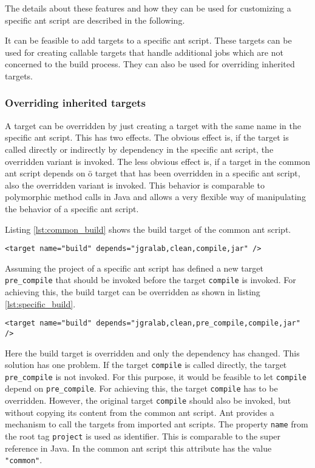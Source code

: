 \documentclass[a4paper,twoside,11pt,bibtotoc]{article}
\begin{document}
The details about these features and how they can be used for customizing a specific ant script are described in the following.

It can be feasible to add targets to a specific ant script.
These targets can be used for creating callable targets that handle additional jobs which are not concerned to the build process.%
They can also be used for overriding inherited targets.

\subsubsection{Overriding inherited targets}
\label{sec:override}
A target can be overridden by just creating a target with the same name in the specific ant script.
This has two effects.
The obvious effect is, if the target is called directly or indirectly by dependency in the specific ant script, the overridden variant is invoked.
The less obvious effect is, if a target in the common ant script depends on ö target that has been overridden in a specific ant script, also the overridden variant is invoked.
This behavior is comparable to polymorphic method calls in Java and allows a very flexible way of manipulating the behavior of a specific ant script.

Listing \ref{lst:common_build} shows the build target of the common ant script.
\begin{lstlisting}[caption=Target built in the common ant script,label=lst:common_build,float=!ht,language=ant]
	<target name="build" depends="jgralab,clean,compile,jar" />
\end{lstlisting}

Assuming the project of a specific ant script has defined a new target \texttt{pre\_compile} that should be invoked before the target \texttt{compile} is invoked.
For achieving this, the build target can be overridden as shown in listing \ref{lst:specific_build}.

\begin{lstlisting}[caption=Target built in a specific ant script,label=lst:specific_build,float=!ht,language=ant]
	<target name="build" depends="jgralab,clean,pre_compile,compile,jar" />
\end{lstlisting}

Here the build target is overridden and only the dependency has changed.
This solution has one problem.
If the target \texttt{compile} is called directly, the target \texttt{pre\_compile} is not invoked.
For this purpose, it would be feasible to let \texttt{compile} depend on \texttt{pre\_compile}.
For achieving this, the target \texttt{compile} has to be overridden.
However, the original target \texttt{compile} should also be invoked, but without copying its content from the common ant script.
Ant provides a mechanism to call the targets from imported ant scripts.
The property \texttt{name} from the root tag \texttt{project} is used as identifier.
This is comparable to the super reference in Java.
In the common ant script this attribute has the value \texttt{"common"}.
\end{document}
